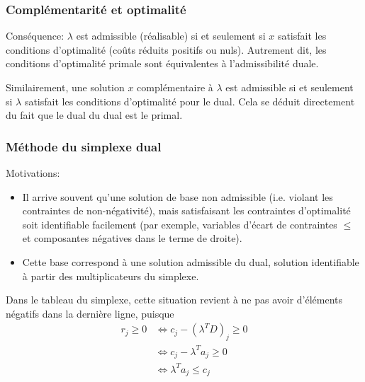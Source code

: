 \documentclass[usepdftitle=false]{beamer}
\begin{document}
\begin{frame}
	\frametitle{Complémentarité et optimalité}
	
	Conséquence: $\lambda$ est admissible (réalisable) si et seulement si $x$ satisfait les conditions d'optimalité (coûts réduits positifs ou nuls).
	Autrement dit, les conditions d'optimalité primale sont équivalentes à l'admissibilité duale.
	
	\mbox{}
	
	Similairement, une solution $x$ complémentaire à $\lambda$ est admissible si et seulement si $\lambda$ satisfait les conditions d’optimalité pour le dual. Cela se déduit directement du fait que le dual du dual est le primal.
	
\end{frame}

\begin{frame}
	\frametitle{Méthode du simplexe dual}
	
	Motivations:
	\begin{itemize}
		\item
		Il arrive souvent qu’une solution de base non admissible (i.e. violant les contraintes de non-négativité), mais satisfaisant les contraintes d'optimalité soit identifiable facilement (par exemple, variables d’écart de contraintes $\leq$ et composantes négatives dans le terme de droite).
		\item
		Cette base correspond à une solution admissible du dual, solution identifiable à partir des multiplicateurs du simplexe.
	\end{itemize}
	
	
	\mbox{}
	
	Dans le tableau du simplexe, cette situation revient à ne pas avoir d'éléments négatifs dans la dernière ligne, puisque
	\begin{align*}
		r_{j} \geq 0 
		& \Leftrightarrow c_{j} - (\lambda^T D)_j \geq 0 \\
		& \Leftrightarrow c_{j} - \lambda^T a_j \geq 0 \\
		& \Leftrightarrow \lambda^T a_j \leq c_j \\
	\end{align*}
	
\end{frame}
\end{document}
